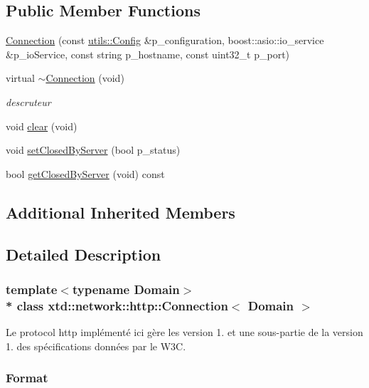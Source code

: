 \subsection*{Public Member Functions}
\begin{DoxyCompactItemize}
\item 
\hyperlink{classxtd_1_1network_1_1http_1_1Connection_ae327f3b673c40a8481aa7e39c1bc09a4}{Connection} (const \hyperlink{classxtd_1_1network_1_1utils_1_1Config}{utils\+::\+Config} \&p\+\_\+configuration, boost\+::asio\+::io\+\_\+service \&p\+\_\+io\+Service, const string p\+\_\+hostname, const uint32\+\_\+t p\+\_\+port)
\item 
virtual \hyperlink{classxtd_1_1network_1_1http_1_1Connection_a23b8ae18927be28e3c778b1a1b23eb60}{$\sim$\+Connection} (void)
\begin{DoxyCompactList}\small\item\em descruteur \end{DoxyCompactList}\item 
void \hyperlink{classxtd_1_1network_1_1http_1_1Connection_a6bc2b4d2ca1c399b2cce22e14b52d9c4}{clear} (void)
\item 
void \hyperlink{classxtd_1_1network_1_1http_1_1Connection_a7ba68b95f6a467599c0daa93960f5821}{set\+Closed\+By\+Server} (bool p\+\_\+status)
\item 
bool \hyperlink{classxtd_1_1network_1_1http_1_1Connection_abc2998698af66ef08e5750f43e45b00f}{get\+Closed\+By\+Server} (void) const 
\end{DoxyCompactItemize}
\subsection*{Additional Inherited Members}


\subsection{Detailed Description}
\subsubsection*{template$<$typename Domain$>$\\*
class xtd\+::network\+::http\+::\+Connection$<$ Domain $>$}

Le protocol http implémenté ici gère les version 1. et une sous-\/partie de la version 1. des spécifications données par le W3C. \subsubsection*{Format}

